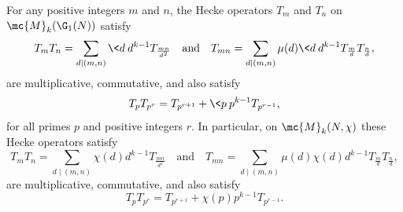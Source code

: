 \documentclass[12pt]{article}
\begin{document}
      \begin{theorem}\label{thm:Hecke_operators_composition_formula}
        For any positive integers \(m\) and \(n\), the Hecke operators \(T_{m}\) and \(T_{n}\) on \(\mc{M}_{k}(\G_{1}(N))\) satisfy
        \[
          T_{m}T_{n} = \sum_{d \mid (m,n)}\<d\>d^{k-1}T_{\frac{mn}{d^{2}}} \quad \text{and} \quad T_{mn} = \sum_{d \mid (m,n)}\mu(d)\<d\>d^{k-1}T_{\frac{m}{d}}T_{\frac{n}{d}},
        \]
        are multiplicative, commutative, and also satisfy
        \[
          T_{p}T_{p^{r}} = T_{p^{r+1}}+\<p\>p^{k-1}T_{p^{r-1}},
        \]
        for all primes \(p\) and positive integers \(r\). In particular, on \(\mc{M}_{k}(N,\chi)\) these Hecke operators satisfy
        \[
          T_{m}T_{n} = \sum_{d \mid (m,n)}\chi(d)d^{k-1}T_{\frac{mn}{d^{2}}} \quad \text{and} \quad T_{mn} = \sum_{d \mid (m,n)}\mu(d)\chi(d)d^{k-1}T_{\frac{m}{d}}T_{\frac{n}{d}},
        \]
        are multiplicative, commutative, and also satisfy
        \[
          T_{p}T_{p^{r}} = T_{p^{r+1}}+\chi(p)p^{k-1}T_{p^{r-1}}.
        \]
      \end{theorem}
\end{document}
